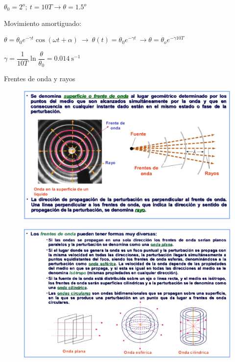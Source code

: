 $\theta_0=2^o;\ t=10 T \to \theta =1.5^o$

Movimiento amortiguado: 

$ \theta=\theta_0 e^{-\gamma t}\cos (\omega t + \alpha) \ \to \ \theta(t)=\theta_0 e^{-\gamma t} \ \to \theta=\theta_o e^{-\gamma 10 T}$

$\gamma=\dfrac {1}{10T} \ln \dfrac {\theta}{\theta_0}=0.014 \ \mathrm{s}^{-1}$







\newpage
\begin{myblock}{Frentes de onda y rayos}
	\begin{figure}[H]
		\centering
		\includegraphics[width=1\textwidth]{imagenes/imagenes21/T21IM11.png}
	\end{figure}
	\begin{figure}[H]
		\centering
		\includegraphics[width=1\textwidth]{imagenes/imagenes21/T21IM12.png}
	\end{figure}
\end{myblock}



